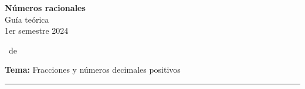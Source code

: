 \documentclass[spanish,letterpaper, 11pt, addpoints, answers]{exam}
\begin{document}

\begin{center}
\textbf{Números racionales} \\
Guía teórica\\
1er semestre 2024
\end{center}
\extraheadheight{-0.5in}

\runningheadrule \extraheadheight{0.15in}

\vspace{0.15in}
\runningheadrule \extraheadheight{0.14in}

\runningfooter{}
              {\thepage\ de \numpages}
              {}
\vspace{0.05in}

\nopointsinmargin
\setlength\linefillthickness{0.1pt}
\setlength\answerlinelength{0.1in}
\vspace{0.1in}

\parbox{6in}{
\textbf{Tema:} Fracciones y números decimales positivos}
\vspace{0.15in}
\hrule 
\end{document}
